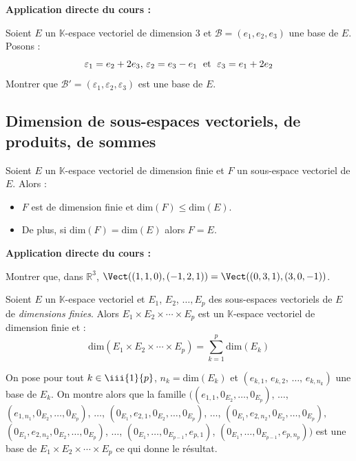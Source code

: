 \documentclass[french,11pt,twoside]{VcCours}
\newenvironment{ApplicationDirecte}{\textbf{Application directe du cours :}

}{}
\begin{document}
\begin{ApplicationDirecte} Soient $E$ un $\mathbb{K}$-espace vectoriel de dimension 3 et $\mathcal{B} = (e_{1} ,e_{2} ,e_{3})$ une base de $E$. Posons :
  \[
  \varepsilon_{1} = e_{2} + 2e_{3} , \, \varepsilon_{2} = e_{3} - e_{1} \; \hbox{ et } \; \varepsilon_{3} = e_{1} + 2e_{2}
  \]
Montrer que $\mathcal{B}' = (\varepsilon_{1} ,\varepsilon_{2} ,\varepsilon_{3})$ est une base de $E$.
\end{ApplicationDirecte}

\medskip
\subsection{Dimension de sous-espaces vectoriels, de produits, de sommes}

\begin{Proposition}{}  Soient $E$ un $\mathbb{K}$-espace vectoriel de dimension finie et $F$ un sous-espace vectoriel de $E$. Alors :

\begin{itemize}
\item $F$ est de dimension finie et $\textrm{dim}(F) \leq \textrm{dim}(E)$.
\item De plus, si $\textrm{dim}(F) = \textrm{dim}(E)$ alors $F=E$.
\end{itemize}
\end{Proposition}

\begin{ApplicationDirecte} Montrer que, dans $\mathbb{R}^3$, $\Vect((1,1,0), (-1,2,1))= \Vect((0,3,1), (3,0,-1))$.
\end{ApplicationDirecte}

\begin{Proposition}{}
Soient $E$ un $\mathbb{K}$-espace vectoriel et $E_1$, $E_2$, $\ldots, E_p$ des sous-espaces vectoriels de $E$ de \emph{dimensions finies}. Alors $E_1 \times E_2 \times \cdots \times E_p$ est un $\mathbb{K}$-espace vectoriel de dimension finie et :
$$ \textrm{dim}(E_1 \times E_2 \times \cdots \times E_p) = \sum_{k=1}^p \textrm{dim} (E_k)$$
\end{Proposition}

\begin{Demonstration}{} On pose pour tout $k \in \iii{1}{p}$, 
	$n_k = \textrm{dim} (E_k)$ et $(e_{k,1}, \, e_{k,2}, \, \ldots, \, e_{k,n_k})$ 
	une base de $E_k$. On montre alors que la famille 
	$((e_{1,1}, 0_{E_2}, \ldots, 0_{E_p})$, $\ldots$, 
	$(e_{1,n_1}, 0_{E_2}, \ldots, 0_{E_p})$, $\ldots$, 
	$(0_{E_1},e_{2,1}, 0_{E_2}, \ldots, 0_{E_p})$, $\ldots$,
	$(0_{E_1},e_{2,n_2}, 0_{E_2}, \ldots,0_{E_p}),$
	$(0_{E_1},e_{2,n_2}, 0_{E_2}, \ldots,0_{E_p})$, $\ldots$, 
	$(0_{E_1},\ldots, 0_{E_{p-1}}, e_{p,1})$, $(0_{E_1},\ldots, 
	0_{E_{p-1}}, e_{p,n_p}))$ est une base de $E_1 \times E_2 \times \cdots \times E_p$
	ce qui donne le résultat.
\end{Demonstration}
\end{document}
